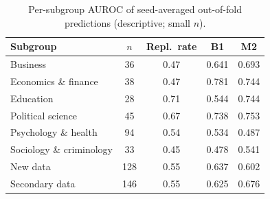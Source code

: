 \begin{table}[t]\centering\caption{Per-subgroup AUROC of seed-averaged out-of-fold predictions (descriptive; small $n$).}\label{tab:sub}
\scriptsize\setlength{\tabcolsep}{3pt}\begin{tabular}{@{}lcccc@{}}\toprule
Subgroup & $n$ & Repl.\ rate & B1 & M2 \\\midrule
Business & 36 & 0.47 & 0.641 & 0.693 \\
Economics \& finance & 38 & 0.47 & 0.781 & 0.744 \\
Education & 28 & 0.71 & 0.544 & 0.744 \\
Political science & 45 & 0.67 & 0.738 & 0.753 \\
Psychology \& health & 94 & 0.54 & 0.534 & 0.487 \\
Sociology \& criminology & 33 & 0.45 & 0.478 & 0.541 \\
New data & 128 & 0.55 & 0.637 & 0.602 \\
Secondary data & 146 & 0.55 & 0.625 & 0.676 \\
\bottomrule\end{tabular}\end{table}
